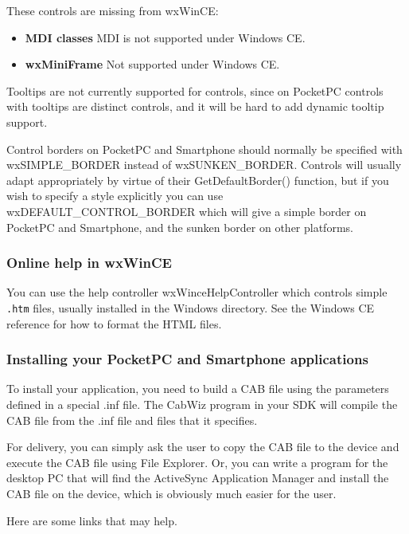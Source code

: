 These controls are missing from wxWinCE:

\itemsep=0pt
\begin{itemize}
\item {\bf MDI classes} MDI is not supported under Windows CE.
\item {\bf wxMiniFrame} Not supported under Windows CE.
\end{itemize}

Tooltips are not currently supported for controls, since on PocketPC controls with
tooltips are distinct controls, and it will be hard to add dynamic
tooltip support.

Control borders on PocketPC and Smartphone should normally be specified with
wxSIMPLE\_BORDER instead of wxSUNKEN\_BORDER. Controls will usually adapt
appropriately by virtue of their GetDefaultBorder() function, but if you
wish to specify a style explicitly you can use wxDEFAULT\_CONTROL\_BORDER
which will give a simple border on PocketPC and Smartphone, and the sunken border on
other platforms.

\subsubsection{Online help in wxWinCE}

You can use the help controller wxWinceHelpController which controls
simple {\tt .htm} files, usually installed in the Windows directory.
See the Windows CE reference for how to format the HTML files.

\subsubsection{Installing your PocketPC and Smartphone applications}

To install your application, you need to build a CAB file using
the parameters defined in a special .inf file. The CabWiz program
in your SDK will compile the CAB file from the .inf file and
files that it specifies.

For delivery, you can simply ask the user to copy the CAB file to the
device and execute the CAB file using File Explorer. Or, you can
write a program for the desktop PC that will find the ActiveSync
Application Manager and install the CAB file on the device,
which is obviously much easier for the user.

Here are some links that may help.


